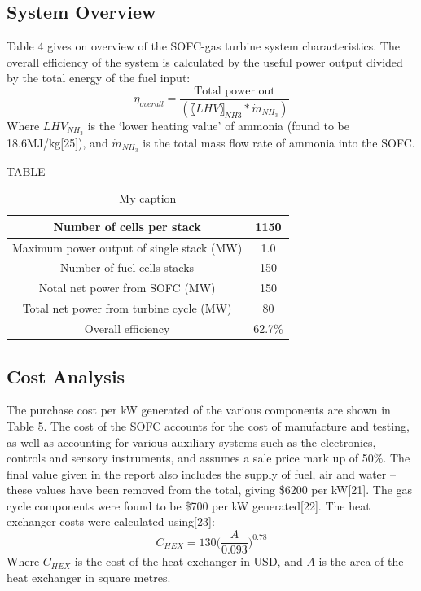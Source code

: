 \subsection{System Overview}
Table 4 gives on overview of the SOFC-gas turbine system characteristics. The overall efficiency of the system is calculated by the useful power output divided by the total energy of the fuel input:
\begin{equation}
\eta_{overall}=  \frac{\text{Total power out}}{(〖LHV〗_{NH3}* \dot{m}_{NH_3})}				
\end{equation}
Where $LHV_{NH_3}$ is the ‘lower heating value’ of ammonia (found to be 18.6MJ/kg[25]), and $\dot{m}_{NH_3}$ is the total mass flow rate of ammonia into the SOFC.

TABLE
\begin{table}[h!]
\centering
\caption{My caption}
\label{my-label}
\begin{tabular}{|c|c|}
\hline
Number of cells per stack                 & 1150   \\ \hline
Maximum power output of single stack (MW) & 1.0    \\ \hline
Number of fuel cells stacks               & 150    \\ \hline
Notal net power from SOFC (MW)            & 150    \\ \hline
Total net power from turbine cycle (MW)   & 80     \\ \hline
Overall efficiency                        & 62.7\% \\ \hline
\end{tabular}
\end{table}

\subsection{Cost Analysis}
The purchase cost per kW generated of the various components are shown in Table 5. The cost of the SOFC accounts for the cost of manufacture and testing, as well as accounting for various auxiliary systems such as the electronics, controls and sensory instruments, and assumes a sale price mark up of 50\%. The final value given in the report also includes the supply of fuel, air and water – these values have been removed from the total, giving \$6200 per kW[21]. The gas cycle components were found to be \$700 per kW generated[22]. The heat exchanger costs were calculated using[23]:
\begin{equation}
C_{HEX}=130\Big ( \frac{A}{0.093}\Big )	^{0.78} 					
\end{equation}
Where $C_{HEX}$ is the cost of the heat exchanger in USD, and $A$ is the area of the heat exchanger in square metres.

